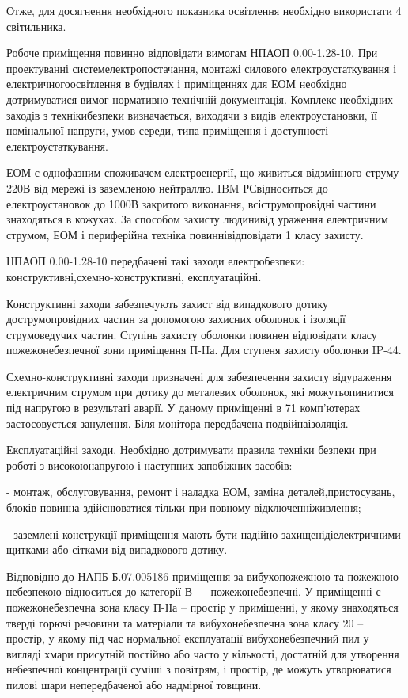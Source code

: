 \documentclass{diploma}
\begin{document}
Отже, для досягнення необхідного показника освітлення необхідно використати 4 світильника.



Робоче приміщення повинно відповідати вимогам НПАОП 0.00-1.28-10.
При проектуванні системелектропостачання, монтажі силового електроустаткування і електричногоосвітлення в будівлях і приміщеннях для ЕОМ необхідно дотримуватися вимог нормативно-технічній документація. Комплекс необхідних заходів з технікибезпеки визначається, виходячи з видів електроустановки, її номінальної напруги, умов середи, типа приміщення і доступності електроустаткування.
 
ЕОМ є однофазним споживачем електроенергії, що живиться відзмінного струму 220В від мережі із заземленою нейтраллю. IBM РСвідноситься до електроустановок до 1000В закритого виконання, всіструмопровідні частини знаходяться в кожухах. За способом захисту людинивід ураження електричним струмом, ЕОМ і периферійна техніка повиннівідповідати 1 класу захисту.
 
НПАОП 0.00-1.28-10 передбачені такі заходи електробезпеки: конструктивні,схемно-конструктивні, експлуатаційні.
 
Конструктивні заходи забезпечують захист від випадкового дотику дострумопровідних частин за допомогою захисних оболонок і ізоляції струмоведучих частин. Ступінь захисту оболонки повинен відповідати класу пожежонебезпечної зони приміщення П-IIа. Для ступеня захисту оболонки IP-44.

Схемно-конструктивні заходи призначені для забезпечення захисту відураження електричним струмом при дотику до металевих оболонок, які можутьопинитися під напругою в результаті аварії. У даному приміщенні в 71 комп'ютерах застосовується занулення. Біля монітора передбачена подвійнаізоляція.

Експлуатаційні заходи. Необхідно дотримувати правила техніки безпеки при роботі з високоюнапругою і наступних запобіжних засобів:

 - монтаж, обслуговування, ремонт і наладка ЕОМ, заміна деталей,пристосувань, блоків повинна здійснюватися тільки при повному відключенніживлення;
 
 - заземлені конструкції приміщення мають бути надійно захищенідіелектричними щитками або сітками від випадкового дотику.



Відповідно до НАПБ Б.07.005186 приміщення за вибухопожежною та пожежною небезпекою відноситься до категорії В --- пожежонебезпечні. У приміщенні є пожежонебезпечна зона класу П-ІІа – простір у приміщенні, у якому знаходяться тверді горючі речовини та матеріали та вибухонебезпечна зона класу 20 – простір, у якому під час нормальної
експлуатації вибухонебезпечний пил у вигляді хмари присутній постійно або
часто у кількості, достатній для утворення небезпечної концентрації суміші з
повітрям, і простір, де можуть утворюватися пилові шари непередбаченої або
надмірної товщини.
\end{document}
